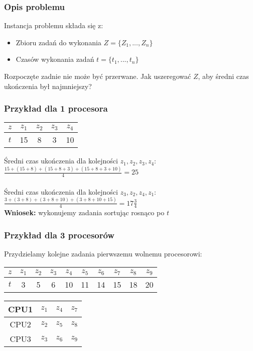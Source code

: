 \subsubsection{Opis problemu}
Instancja problemu składa się z:
\begin{itemize}
	\item Zbioru zadań do wykonania $Z= \{ Z_1,...,Z_n \}$
    \item Czasów wykonania zadań $t = \{ t_1,...,t_n\}$
\end{itemize}
Rozpoczęte zadnie nie może być przerwane.
Jak uszeregować $Z$, aby średni czas ukończenia był najmniejszy?

\subsubsection{Przykład dla 1 procesora}
\begin{center}
\begin{tabular}{ c | c | c | c | c }
  $z$ & $z_1$	& $z_2$ & $z_3$ & $z_4$ \\ \hline
  $t$ & 15 		&  8 	& 3 	& 10 \\ 
\end{tabular}
\end{center}
Średni czas ukończenia dla kolejności $z_1, z_2, z_3, z_4$:
$\frac{15+(15+8)+(15+8+3)+(15+8+3+10)}{4}= 25$ \\
\\
Średni czas ukończenia dla kolejności $z_3, z_2, z_4, z_1$:
$\frac{3+(3+8)+(3+8+10)+(3+8+10+15)}{4} = 17\frac{3}{4}$ \\

\textbf{Wniosek:} wykonujemy zadania sortując rosnąco po $t$ 

\subsubsection{Przykład dla 3 procesorów}
Przydzielamy kolejne zadania pierwszemu wolnemu procesorowi:
\begin{center}
\begin{tabular}{ c | c | c | c | c | c | c | c | c | c } 
  $z$ 	& $z_1$	& $z_2$ & $z_3$ & $z_4$	& $z_5$	& $z_6$ & $z_7$ & $z_8$	& $z_9$ \\ \hline
  $t$ 	& 3		& 5		& 6		& 10	& 11	& 14	& 15	& 18	& 20 \\ 
\end{tabular}
\end{center}

\begin{center}
\begin{tabular}{ c | c | c | c }
  CPU1 & $z_1$ & $z_4$ & $z_7$ \\ \hline
  CPU2 & $z_2$ & $z_5$ & $z_8$ \\ \hline
  CPU3 & $z_3$ & $z_6$ & $z_9$ \\
\end{tabular}
\end{center}

